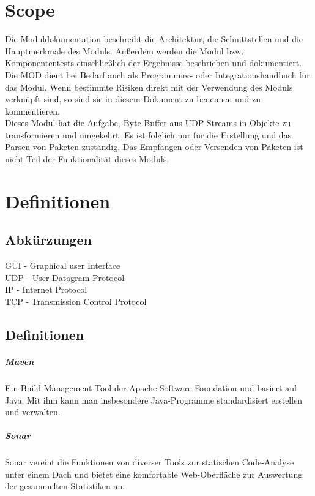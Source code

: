 
\chapter{Scope}
Die Moduldokumentation beschreibt die Architektur, die Schnittstellen 
und die Hauptmerkmale des Moduls. Außerdem werden die Modul bzw. Komponententests 
einschließlich der Ergebnisse beschrieben und dokumentiert. 
Die MOD dient bei Bedarf auch als Programmier- oder Integrationshandbuch für das 
Modul. Wenn bestimmte Risiken direkt mit der Verwendung des Moduls verknüpft sind,
so sind sie in diesem Dokument zu benennen und zu kommentieren.
\\
Dieses Modul hat die Aufgabe, Byte Buffer aus UDP Streams in Objekte zu transformieren und umgekehrt.
Es ist folglich nur für die Erstellung und das Parsen von Paketen zuständig.
Das Empfangen oder Versenden von Paketen ist nicht Teil der Funktionalität dieses Moduls.

\chapter{Definitionen}

\section{Abkürzungen}

GUI - Graphical user Interface  \\
UDP - User Datagram Protocol \\
IP - Internet Protocol \\
TCP - Transmission Control Protocol
\section{Definitionen}

\paragraph{Maven} Ein Build-Management-Tool der Apache Software Foundation und basiert auf
Java. Mit ihm kann man insbesondere Java-Programme standardisiert erstellen und
verwalten.
\paragraph{Sonar} Sonar vereint die Funktionen von diverser Tools zur statischen Code-Analyse
unter einem Dach und bietet eine komfortable Web-Oberfläche zur Auswertung der
gesammelten Statistiken an.

